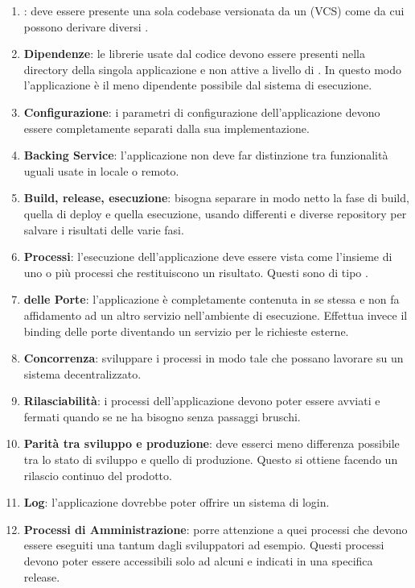 		\begin{enumerate}
			\item \textbf{}: deve essere presente una sola codebase versionata da un  (VCS) come  da cui
			possono derivare diversi .
			\item \textbf{Dipendenze}: le librerie usate dal codice devono essere presenti nella directory della singola applicazione e non attive a livello di . In questo modo l'applicazione è il meno dipendente possibile dal sistema di esecuzione.
			\item \textbf{Configurazione}: i parametri di configurazione dell'applicazione devono essere completamente separati dalla sua implementazione.
			\item \textbf{Backing Service}: l'applicazione non deve far distinzione tra funzionalità uguali usate in locale o remoto.
			\item \textbf{Build, release, esecuzione}: bisogna separare in modo netto la fase di build, quella di deploy e quella esecuzione, usando  differenti e diverse repository per salvare i risultati delle varie fasi.
			\item \textbf{Processi}: l'esecuzione dell'applicazione deve essere vista come l'insieme di uno o più processi che restituiscono un risultato. Questi sono di tipo .
			\item \textbf{ delle Porte}: l'applicazione è completamente contenuta in se stessa e non fa affidamento ad un altro servizio nell'ambiente di esecuzione. Effettua invece il binding delle porte diventando un servizio per le richieste esterne.
			\item \textbf{Concorrenza}: sviluppare i processi in modo tale che possano lavorare su un sistema decentralizzato.
			\item \textbf{Rilasciabilità}: i processi dell'applicazione devono poter essere avviati e fermati quando se ne ha bisogno senza passaggi bruschi.
			\item \textbf{Parità tra sviluppo e produzione}: deve esserci meno differenza possibile tra lo stato di sviluppo e quello di produzione. Questo si ottiene facendo un rilascio continuo del prodotto.
			\item \textbf{Log}: l'applicazione dovrebbe poter offrire un sistema di login.
			\item \textbf{Processi di Amministrazione}: porre attenzione a quei processi che devono essere eseguiti una tantum dagli sviluppatori ad esempio. Questi processi devono poter essere accessibili solo ad alcuni e indicati in una specifica release.
		\end{enumerate}

